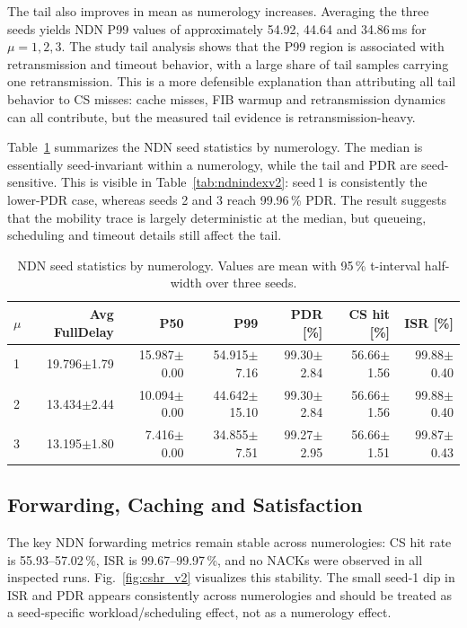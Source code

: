 \documentclass[journal]{IEEEtran}
\newcommand{\micro}{$\mu$}
\begin{document}
The tail also improves in mean as numerology increases. Averaging the three seeds yields NDN P99 values of approximately 54.92, 44.64 and 34.86\,ms for $\mu=1,2,3$. The study tail analysis shows that the P99 region is associated with retransmission and timeout behavior, with a large share of tail samples carrying one retransmission. This is a more defensible explanation than attributing all tail behavior to CS misses: cache misses, FIB warmup and retransmission dynamics can all contribute, but the measured tail evidence is retransmission-heavy.

Table~\ref{tab:ndnagg} summarizes the NDN seed statistics by numerology. The median is essentially seed-invariant within a numerology, while the tail and PDR are seed-sensitive. This is visible in Table~\ref{tab:ndnindexv2}: seed\,1 is consistently the lower-PDR case, whereas seeds 2 and 3 reach 99.96\,\% PDR. The result suggests that the mobility trace is largely deterministic at the median, but queueing, scheduling and timeout details still affect the tail.

\begin{table}[!t]\centering
\caption{NDN seed statistics by numerology. Values are mean with 95\,\% t-interval half-width over three seeds.}
\label{tab:ndnagg}
\footnotesize
\begin{tabular}{@{}lrrrrrr@{}}
\toprule
\micro & Avg FullDelay & P50 & P99 & PDR [\%] & CS hit [\%] & ISR [\%]\\
\midrule
1 & 19.796$\pm$1.79 & 15.987$\pm$0.00 & 54.915$\pm$7.16 & 99.30$\pm$2.84 & 56.66$\pm$1.56 & 99.88$\pm$0.40\\
2 & 13.434$\pm$2.44 & 10.094$\pm$0.00 & 44.642$\pm$15.10 & 99.30$\pm$2.84 & 56.66$\pm$1.56 & 99.88$\pm$0.40\\
3 & 13.195$\pm$1.80 & 7.416$\pm$0.00 & 34.855$\pm$7.51 & 99.27$\pm$2.95 & 56.66$\pm$1.51 & 99.87$\pm$0.43\\
\bottomrule
\end{tabular}
\end{table}

\subsection{Forwarding, Caching and Satisfaction}

The key NDN forwarding metrics remain stable across numerologies: CS hit rate is 55.93--57.02\,\%, ISR is 99.67--99.97\,\%, and no NACKs were observed in all inspected runs. Fig.~\ref{fig:cshr_v2} visualizes this stability. The small seed-1 dip in ISR and PDR appears consistently across numerologies and should be treated as a seed-specific workload/scheduling effect, not as a numerology effect.
\end{document}
